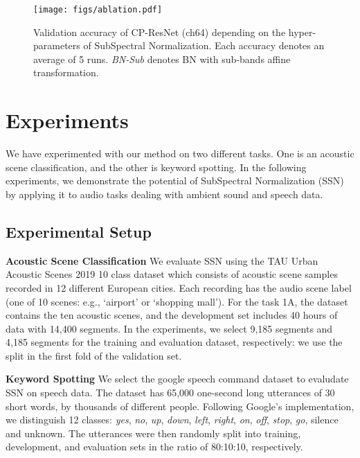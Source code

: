 \documentclass{article}
\begin{document}
\begin{figure}[t]
\centering
\texttt{[image: figs/ablation.pdf]}
\vskip -0.1in
\caption{Validation accuracy of CP-ResNet (ch64) depending on the hyper-parameters of SubSpectral Normalization. Each accuracy denotes an average of 5 runs. \textit{BN-Sub} denotes BN with sub-bands affine transformation.}
\label{fig:ablation}
\end{figure}


\section{Experiments}
\label{sec:exp}
We have experimented with our method on two different tasks. One is an acoustic scene classification, and the other is keyword spotting. In the following experiments, we demonstrate the potential of SubSpectral Normalization (SSN) by applying it to audio tasks dealing with ambient sound and speech data.

\subsection{Experimental Setup}
\textbf{Acoustic Scene Classification}
We evaluate SSN using the TAU Urban Acoustic Scenes 2019 10 class dataset \cite{Mesaros2018_DCASE} which consists of acoustic scene samples recorded in 12 different European cities. Each recording has the audio scene label (one of 10 scenes: e.g., `airport' or `shopping mall'). For the task 1A, the dataset contains the ten acoustic scenes, and the development set includes 40 hours of data with 14,400 segments. In the experiments, we select 9,185 segments and 4,185 segments for the training and evaluation dataset, respectively: we use the split in the first fold of the validation set.

\noindent\textbf{Keyword Spotting}
We select the google speech command dataset \cite{sainath2015convolutional} to evaludate SSN on speech data. The dataset has 65,000 one-second long utterances of 30 short words, by thousands of different people. Following Google’s implementation, we distinguish 12 classes: \textit{yes}, \textit{no}, \textit{up}, \textit{down}, \textit{left}, \textit{right}, \textit{on}, \textit{off}, \textit{stop}, \textit{go}, silence and unknown. The utterances were then randomly split into training, development, and evaluation sets in the ratio of 80:10:10, respectively.
\end{document}
